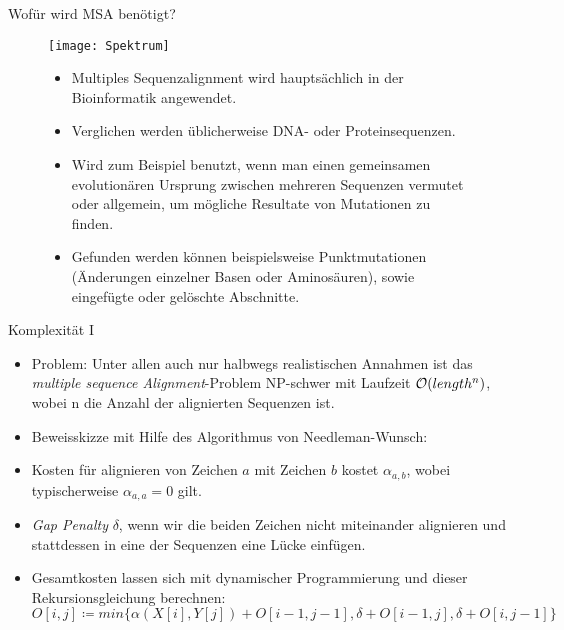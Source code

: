 \documentclass[wide,xcolor={x11names},hyperref={colorlinks=false},pantone312]{beamer}
\begin{document}
\begin{frame}[t]{Wofür wird MSA benötigt?}
	\begin{figure}[tbp]
		\vspace{-0.5cm}
		\begin{minipage}[t]{4cm}
			\vspace{0pt}
			\texttt{[image: Spektrum]}
			\cite{Reno18}
		\end{minipage}
		\hfill
		\begin{minipage}[t]{7cm}
			\small
			\begin{itemize}
				\item Multiples Sequenzalignment wird hauptsächlich in der Bioinformatik angewendet.  \cite{MDW96}
				\item Verglichen werden üblicherweise DNA- oder Proteinsequenzen.
				\item Wird zum Beispiel benutzt, wenn man einen gemeinsamen evolutionären Ursprung zwischen mehreren Sequenzen vermutet oder allgemein, um mögliche Resultate von Mutationen zu finden.
				\item Gefunden werden können beispielsweise Punktmutationen (Änderungen einzelner Basen oder Aminosäuren), sowie eingefügte oder gelöschte Abschnitte.
			\end{itemize}
			\normalsize
		\end{minipage}
	\end{figure}
\end{frame}

\begin{frame}[t]{Komplexität I}
	\begin{itemize}
		\item Problem: Unter allen auch nur halbwegs realistischen Annahmen ist das \textit{multiple sequence Alignment}-Problem NP-schwer mit Laufzeit $\mathcal{O}(length^ n)$, wobei n die Anzahl der alignierten Sequenzen ist. \cite{WJ94}
		\item Beweisskizze mit Hilfe des Algorithmus von Needleman-Wunsch:
		\item Kosten für alignieren von Zeichen $a$ mit Zeichen $b$ kostet $\alpha_{a,b}$, wobei typischerweise $\alpha_{a,a} = 0$ gilt.
		\item \emph{Gap Penalty} $\delta$, wenn wir die beiden Zeichen nicht miteinander alignieren und stattdessen in eine der Sequenzen eine Lücke einfügen.
		\item Gesamtkosten lassen sich mit dynamischer Programmierung und dieser Rekursionsgleichung berechnen:  \cite{NW70}
		\begin{equation}
			O[i,j] \coloneqq min\{\alpha(X[i], Y[j]) + O[i-1, j-1], \delta + O[i-1, j], \delta + O[i, j-1]\}
		\end{equation}
	\end{itemize}
\end{frame}
\end{document}

